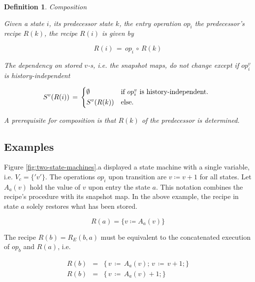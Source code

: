\documentclass[12pt,a4paper]{scrartcl}
\newtheorem{definition}{Definition}
\begin{document}
\begin{definition} Composition

    Given a state $i$, its predecessor state $k$, the entry operation $op_i$
    the predecessor's recipe $R(k)$, the recipe $R(i)$ is given by

    \begin{equation}
        R(i)\,=\,op_i\,\circ\,R(k)
    \end{equation}

    The dependency on stored $v$-s, i.e. the snapshot maps, do not change
    except if $op^v_i$ is history-independent

    \begin{equation} \label{eq:composition-aux}
        S^v(R(i))\,=\,\begin{dcases*}
                      \emptyset & if $op^v_i$ is history-independent. \\
                      S^v(R(k)) & else.\\
                      \end{dcases*}
    \end{equation}

    A prerequisite for composition is that $R(k)$ of the predecessor is 
    determined.

\end{definition}

\subsection{Examples}
                 
Figure \ref{fig:two-state-machines}.a displayed a state machine with a single
variable, i.e. $V_c=\{'v'\}$. The operations $op_i$ upon transition are
$v\coloneqq v+1$ for all states. Let $A_a(v)$ hold the value of $v$ upon entry the
state $a$.  This notation combines the recipe's procedure with its snapshot
map.  In the above example, the recipe in state $a$ solely restores what has
been stored.

\begin{equation} 
    R(a) = \{ v \coloneqq  A_a(v) \} 
\end{equation}

The recipe $R(b)=R_E(b,a)$ must be equivalent to the concatenated execution of
$op_b$ and $R(a)$, i.e.

\begin{eqnarray}
    R(b)&=&\{\,v\,\coloneqq \,A_a(v);\,v\,\coloneqq \,v + 1;\} \\
    R(b)&=&\{\,v\,\coloneqq \,A_a(v) + 1; \}                                 
\end{eqnarray}
\end{document}
